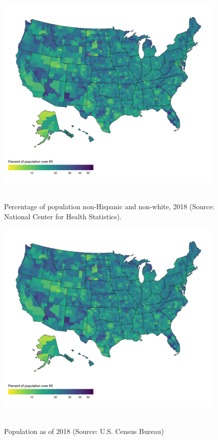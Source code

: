 \documentclass{article}
\begin{document}
\begin{figure}[!h] 
    \centering
    \caption{Percentage of population non-Hispanic and non-white, 2018 (Source: National Center for Health Statistics).}
    \includegraphics[width=11cm]{figures/univariate/figU03_p_nonwhite_nonhispanic.jpg}
    \
\end{figure}
\FloatBarrier

\begin{figure}[!h] 
    \centering
    \caption{Population as of 2018 (Source: U.S. Census Bureau)}
    \includegraphics[width=11cm]{figures/univariate/figU04_population.jpg}
    \
\end{figure}
\FloatBarrier
\end{document}
